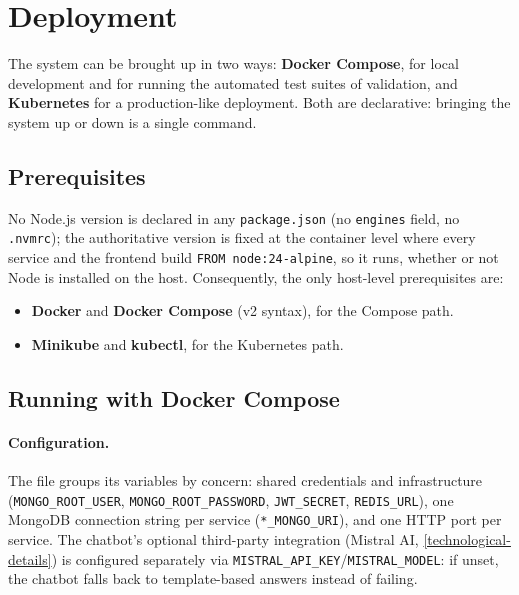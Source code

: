 \section{Deployment}\label{deployment}

The system can be brought up in two ways: \textbf{Docker Compose}, for local
development and for running the automated test suites of validation,
and \textbf{Kubernetes} for a production-like deployment.
Both are declarative: bringing the system up or down is a single command.

\subsection{Prerequisites}\label{deployment-prerequisites}

No Node.js version is declared in any \texttt{package.json} (no
\texttt{engines} field, no \texttt{.nvmrc}); the authoritative version is
fixed at the container level where every service and the
frontend build \texttt{FROM node:24-alpine}, so it runs, whether or not Node is installed on the host. 
Consequently, the
only host-level prerequisites are:

\begin{itemize}
  \item \textbf{Docker} and \textbf{Docker Compose} (v2 syntax), for the
  Compose path.
  \item \textbf{Minikube} and \textbf{kubectl}, for the Kubernetes path.
\end{itemize}

\subsection{Running with Docker Compose}\label{deployment-compose}

\begin{sloppypar}
\paragraph{Configuration.} The file groups its variables by concern:
shared credentials and infrastructure (\texttt{MONGO\_ROOT\_USER},
\texttt{MONGO\_ROOT\_PASSWORD}, \texttt{JWT\_SECRET}, \texttt{REDIS\_URL}),
one MongoDB connection string per service (\texttt{*\_MONGO\_URI}), and one
HTTP port per service. The chatbot's optional third-party integration
(Mistral AI, \cref{technological-details}) is configured separately via
\texttt{MISTRAL\_API\_KEY}/\texttt{MISTRAL\_MODEL}: if unset, the chatbot
falls back to template-based answers instead of failing.
\end{sloppypar}

